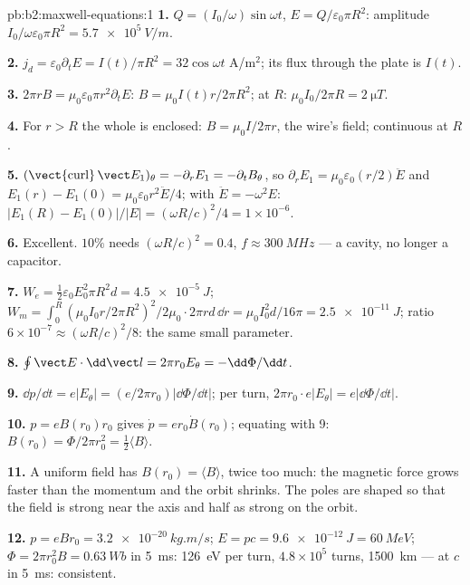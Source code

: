 \begin{solution}{pb:b2:maxwell-equations:1}
\textbf{1.} $Q = (I_0/\omega)\sin\omega t$, $E = Q/\varepsilon_0\pi R^2$: amplitude $I_0/\omega\varepsilon_0
\pi R^2 = \qty{5.7e5}{V/m}$.

\textbf{2.} $j_d = \varepsilon_0\partial_tE = I(t)/\pi R^2 = 32\cos\omega t$ A/m$^2$; its flux
through the plate is $I(t)$.

\textbf{3.} $2\pi rB = \mu_0\varepsilon_0\pi r^2\partial_tE$: $B = \mu_0I(t)r/2\pi R^2$; at $R$:
$\mu_0I_0/2\pi R = \qty{2}{\micro T}$.

\textbf{4.} For $r > R$ the whole  is enclosed: $B =
\mu_0I/2\pi r$, the wire's field; continuous at $R$.

\textbf{5.} $(\operatorname{\vect{curl}}\vect E_1)_\theta = -\partial_rE_1 = -\partial_tB_\theta$, so $\partial_rE_1
= \mu_0\varepsilon_0(r/2)\ddot E$ and $E_1(r) - E_1(0) = \mu_0\varepsilon_0r^2\ddot E/4$; with
$\ddot E = -\omega^2E$: $|E_1(R) - E_1(0)|/|E| = (\omega R/c)^2/4 = 1 \times 10^{-6}$.

\textbf{6.} Excellent. $10\%$ needs $(\omega R/c)^2 = 0.4$, $f \approx \qty{300}{MHz}$ ---
a cavity, no longer a capacitor.

\textbf{7.} $W_e = \tfrac12\varepsilon_0E_0^2\pi R^2d = \qty{4.5e-5}{J}$; $W_m = \int_0^R(\mu_0I_0r/
2\pi R^2)^2/2\mu_0\cdot2\pi rd\,\dd r = \mu_0I_0^2d/16\pi = \qty{2.5e-11}{J}$; ratio $6 \times
10^{-7} \approx (\omega R/c)^2/8$: the same small parameter.

\textbf{8.} $\oint\vect E\cdot\dd\vect l = 2\pi r_0E_\theta = -\dd\Phi/\dd t$.

\textbf{9.} $\dd p/\dd t = e|E_\theta| = (e/2\pi r_0)|\dd\Phi/\dd t|$; per turn,
$2\pi r_0\cdot e|E_\theta| = e|\dd\Phi/\dd t|$.

\textbf{10.} $p = eB(r_0)r_0$ gives $\dot p = er_0\dot B(r_0)$; equating with 9:
$B(r_0) = \Phi/2\pi r_0^2 = \tfrac12\langle B\rangle$.

\textbf{11.} A uniform field has $B(r_0) = \langle B\rangle$, twice too much:
the magnetic force grows faster than the momentum and the orbit
shrinks. The poles are shaped so that the field is strong near the
axis and half as strong on the orbit.

\textbf{12.} $p = eBr_0 = \qty{3.2e-20}{kg.m/s}$; $E = pc = \qty{9.6e-12}{J} = \qty{60}{MeV}$;
$\Phi = 2\pi r_0^2B = \qty{0.63}{Wb}$ in \qty{5}{ms}: \qty{126}{eV} per turn, $4.8 \times
10^5$ turns, \qty{1500}{km} --- at $c$ in \qty{5}{ms}: consistent.


\end{solution}
